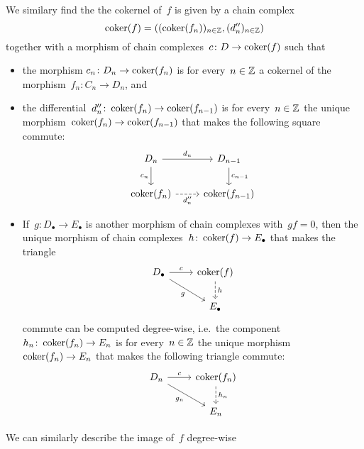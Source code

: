 We similary find the the cokernel of~$f$ is given by a chain complex
\[
    \operatorname{coker}(f)
  = ( (\operatorname{coker}(f_n))_{n \in \mathbb{Z}}, (d''_n)_{n \in \mathbb{Z}} )
\]
together with a morphism of chain complexes~$c \colon D \to \operatorname{coker}(f)$ such that
\begin{itemize}
  \item
    the morphism $c_n \colon D_n \to \operatorname{coker}(f_n)$ is for every~$n \in \mathbb{Z}$ a cokernel of the morphism~$f_n \colon C_n \to D_n$, and
  \item
    the differential~$d''_n \colon \operatorname{coker}(f_n) \to \operatorname{coker}(f_{n-1})$ is for every~$n \in \mathbb{Z}$ the unique morphism~$\operatorname{coker}(f_n) \to \operatorname{coker}(f_{n-1})$ that makes the following square commute:
    \[
      \begin{tikzcd}
          D_n
          \arrow{r}[above]{d_n}
          \arrow{d}[left]{c_n}
        & D_{n-1}
          \arrow{d}[right]{c_{n-1}}
        \\
          \coker(f_n)
          \arrow[dashed]{r}[below]{d''_n}
        & \coker(f_{n-1})
      \end{tikzcd}
    \]
  \item
    If~$g \colon D_\bullet \to E_\bullet$ is another morphism of chain complexes with~$g f = 0$, then the unique morphism of chain complexes~$h \colon \operatorname{coker}(f) \to E_\bullet$ that makes the triangle
    \[
      \begin{tikzcd}
          D_\bullet
          \arrow{r}[above]{c}
          \arrow{dr}[below left]{g}
        & \coker(f)
          \arrow[dashed]{d}[right]{h}
        \\
          {}
        & E_\bullet
      \end{tikzcd}
    \]
    commute can be computed degree-wise, i.e.\ the component~$h_n \colon \operatorname{coker}(f_n) \to E_n$ is for every~$n \in \mathbb{Z}$ the unique morphism~$\operatorname{coker}(f_n) \to E_n$ that makes the following triangle commute:
    \[
      \begin{tikzcd}
          D_n
          \arrow{r}[above]{c}
          \arrow{dr}[below left]{g_n}
        & \coker(f_n)
          \arrow[dashed]{d}[right]{h_n}
        \\
          {}
        & E_n
      \end{tikzcd}
    \]
\end{itemize}


We can similarly describe the image of~$f$ degree-wise





\subsection{}

